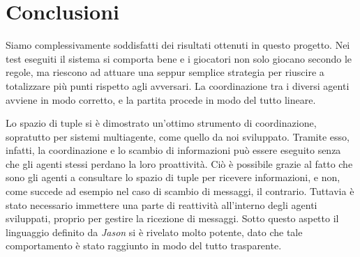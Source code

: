\documentclass[a4paper,12pt]{article}
\begin{document}
\section{Conclusioni} \label{conclusions}
Siamo complessivamente soddisfatti dei risultati ottenuti in questo progetto. Nei test eseguiti il sistema si comporta bene e i giocatori non solo giocano secondo le regole, ma riescono ad attuare una seppur semplice strategia per riuscire a totalizzare più punti rispetto agli avversari. La coordinazione tra i diversi agenti avviene in modo corretto, e la partita procede in modo del tutto lineare.

Lo spazio di tuple si è dimostrato un'ottimo strumento di coordinazione, sopratutto per sistemi multiagente, come quello da noi sviluppato. Tramite esso, infatti, la coordinazione e lo scambio di informazioni può essere eseguito senza che gli agenti stessi perdano la loro proattività. Ciò è possibile grazie al fatto che sono gli agenti a consultare lo spazio di tuple per ricevere informazioni, e non, come succede ad esempio nel caso di scambio di messaggi, il contrario. Tuttavia è stato necessario immettere una parte di reattività all'interno degli agenti sviluppati, proprio per gestire la ricezione di messaggi. Sotto questo aspetto il linguaggio definito da \emph{Jason} si è rivelato molto potente, dato che tale comportamento è stato raggiunto in modo del tutto trasparente. 
\end{document}
